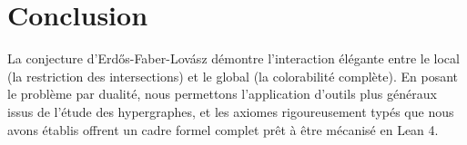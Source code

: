 \documentclass[12pt,a4paper]{article}
\begin{document}
\section{Conclusion}
La conjecture d'Erdős-Faber-Lovász démontre l'interaction élégante entre le local (la restriction des intersections) et le global (la colorabilité complète). En posant le problème par dualité, nous permettons l'application d'outils plus généraux issus de l'étude des hypergraphes, et les axiomes rigoureusement typés que nous avons établis offrent un cadre formel complet prêt à être mécanisé en Lean 4.
\end{document}
